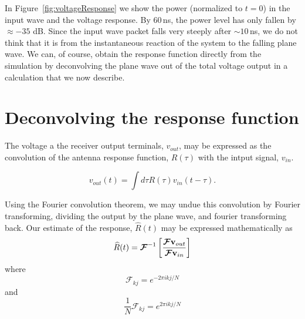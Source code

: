 \documentclass[useAMS,usenatbib]{mn2e}
\begin{document}
In Figure~\ref{fig:voltageResponse} we show the power (normalized to $t=0$) in the input wave and the voltage response. By 60\,ns, the power level has only fallen by $\approx -35$ dB. Since the input wave packet falls very steeply after $\sim 10$\,ns, we do not think that it is from the instantaneous reaction of the system to the falling plane wave. We can, of course, obtain the response function directly from the simulation by deconvolving the plane wave out of the total voltage output in a calculation that we now describe. 

\section{Deconvolving the response function}
The voltage a the receiver output terminals, $v_{out}$, may be expressed as the convolution of the antenna response function, $R(\tau)$ with the intput signal, $v_{in}$. 

\begin{equation}
v_{out}(t) = \int d \tau R(\tau) v_{in}(t - \tau) .
\end{equation}

Using the Fourier convolution theorem, we may undue this convolution by Fourier transforming, dividing the output by the plane wave, and fourier transforming back. Our estimate of the response, $\widehat{R}(t)$ may be expressed mathematically as 
\begin{equation}\label{eq:ftResponse}
\widehat{R}(t) = \boldsymbol{\mathcal{F}}^{-1}\left[ \frac{\boldsymbol{\mathcal{F}}{\bf v}_{out}}{\boldsymbol{\mathcal{F}}{\bf v}_{in}}\right]
\end{equation}
where
\begin{equation}
\boldsymbol{\mathcal{F}}_{kj} = e^{-2 \pi i kj /N}
\end{equation}
and
\begin{equation}
\frac{1}{N} \boldsymbol{\mathcal{F}}_{kj} = e^{2 \pi i kj /N}
\end{equation}
\end{document}
